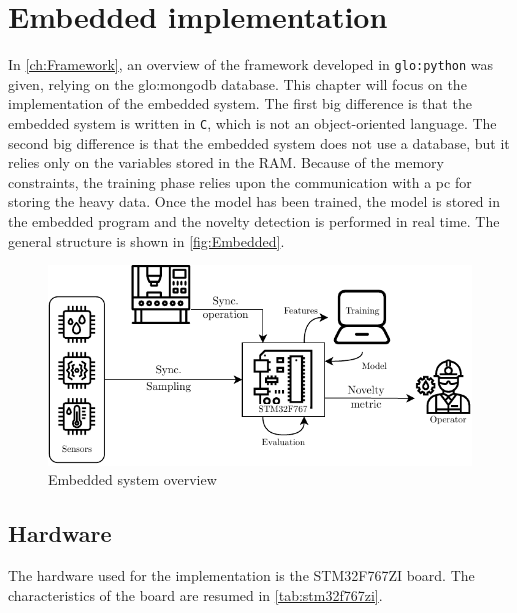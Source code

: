 \chapter{Embedded implementation}
\label{ch:Embedded}
In \autoref{ch:Framework}, an overview of the framework developed in \texttt{\gls{glo:python}} was given, relying on the \gls{glo:mongodb} database. This chapter will focus on the implementation of the embedded system. The first big difference is that the embedded system is written in \texttt{C}, which is not an object-oriented language. The second big difference is that the embedded system does not use a database, but it relies only on the variables stored in the RAM. Because of the memory constraints, the training phase relies upon the communication with a \gls{pc} for storing the heavy data. Once the model has been trained, the model is stored in the embedded program and the novelty detection is performed in real time. The general structure is shown in \autoref{fig:Embedded}.

\begin{figure}
    \centering
    \includegraphics[scale=1]{images/Embedded/EmbeddedStructure.pdf}
    \caption{Embedded system overview}
    \label{fig:Embedded}
\end{figure}


\section{Hardware}
The hardware used for the implementation is the STM32F767ZI board. The characteristics of the board are resumed in \autoref{tab:stm32f767zi}.


